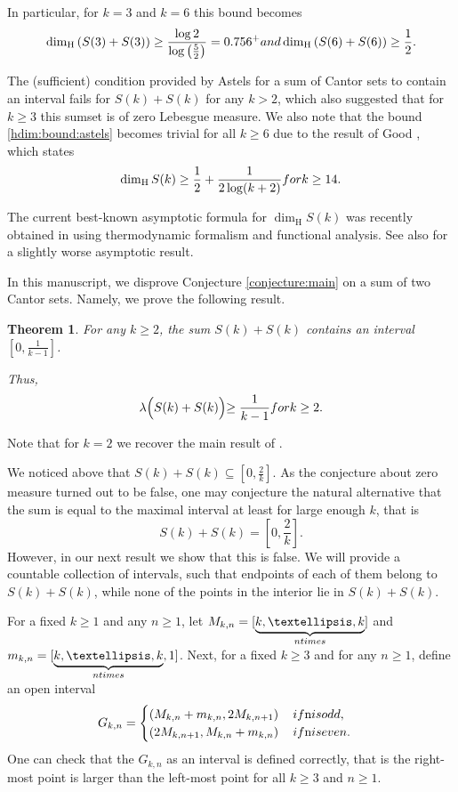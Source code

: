\documentclass{amsart}
\newtheorem{theorem}{Theorem}[section]
\theoremstyle{definition}
\newcommand{\0}{\mbf 0}%
\renewcommand{\text}{\textup}
\newcommand\hdim{\dim_{\mathrm H}}
\begin{document}
In particular, for $k=3$ and $k=6$ this bound becomes
$$
\hdim \left( S(3)+S(3) \right) \geq \frac{\log 2}{\log\left( \frac{5}{2} \right)}=0.756^+ \text{ and }  \hdim \left( S(6)+S(6) \right) \geq \frac{1}{2}.
$$

The (sufficient) condition provided by Astels for a sum of Cantor sets to contain an interval fails for $S(k)+S(k)$ for any $k>2$, which also suggested that for $k\geq3$ this sumset is of zero Lebesgue measure. We also note that the bound \eqref{hdim:bound:astels} becomes trivial for all $k\geq6$ due to the result of Good \cite{MR0004878}, which states
$$
\hdim S(k) \geq \frac{1}{2}+\frac{1}{2\log(k+2)} \text{ for } k\geq14.
$$

The current best-known asymptotic formula for $\hdim S(k)$ was recently obtained in \cite{MR4540838} using thermodynamic formalism and functional analysis. See also \cite{MR2672614} for a slightly worse asymptotic result.

\vskip0.3cm

In this manuscript, we disprove Conjecture \ref{conjecture:main} on a sum of two Cantor sets. Namely, we prove the following result.
\begin{theorem}\label{theorem:main}
For any $k\geq2$, the sum $S(k)+S(k)$ contains an interval $\left[0,\frac{1}{k-1}\right]$. 

Thus, 
 $$
 \lambda\Bigl( S(k)+S(k) \Bigl)\geq \frac{1}{k-1} \text{ for }k\geq 2.
 $$
\end{theorem}
Note that for $k=2$ we recover the main result of \cite{MR0269603}.

We noticed above that $S(k) + S(k) \subseteq \left[0,\frac{2}{k}\right]$. 
As the conjecture about zero measure turned out to be false, one may conjecture the natural alternative that the sum is equal to the maximal interval at least for large enough $k$, that is
$$
S(k) + S(k) = \left[0,\frac{2}{k}\right].
$$
However, in our next result we show that this is false. We will provide a countable collection of intervals, such that endpoints of each of them belong to $S(k)+S(k)$, while none of the points in the interior lie in $S(k)+S(k)$.



For a fixed $k\geq1$ and any $n\geq1$, let $M_{k,n} = [\underbrace{k,\ldots,k}_{n \text{ times }}]$ and $m_{k,n} = [\underbrace{k,\ldots,k}_{n \text{ times }},1]$. Next, for a fixed $k\geq3$ and for any $n\geq1$, define an open interval 
$$
G_{k,n} = \begin{cases}
  \left( M_{k,n}+m_{k,n}, 2M_{k,n+1} \right) \quad \text{if $n$ is odd,}\\
    \left(2M_{k,n+1}, M_{k,n}+m_{k,n} \right) \quad \text{if $n$ is even.} 
\end{cases}
$$
One can check that the $G_{k,n}$ as an interval is defined correctly, that is the right-most point is larger than the left-most point for all $k\geq3$ and $n\geq1$.
\end{document}
